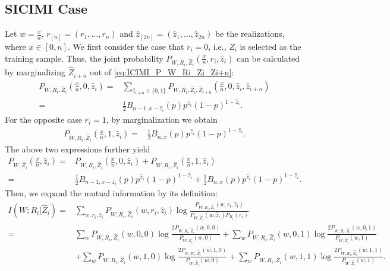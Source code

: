 \documentclass[onecolumn,romanappendices,10pt]{IEEEtran}
\begin{document}
	\subsection{SICIMI Case}  \label{subapp:cal_SICIMI}
	Let $w = \frac{x}{n}$, $r_{[n]} = (r_1, \ldots, r_n)$ and $\hat{z}_{[2n]} = (\hat{z}_1, \ldots, \hat{z}_{2n})$ be the realizations, where $x \in [0, n]$. We first consider the case that $r_i = 0$, i.e., $\hat{Z}_i$ is selected as the training sample. Thus, the joint probability $P_{W, R_i, \hat{Z}_{i}}(\frac{x}{n}, r_i, \hat{z}_{i})$ can be calculated by marginalizing $\hat{Z}_{i+n}$ out of \eqref{eq:ICIMI_P_W_Ri_Zi_Zi+n}:
	\begin{equation}
		\begin{aligned}
			P_{W, R_i, \hat{Z}_{i}}(\frac{x}{n}, 0, \hat{z}_{i}) =& \sum_{\hat{z}_{i+n} \in \{0,1\}} P_{W, R_i, \hat{Z}_{i}, \hat{Z}_{i+n}}(\frac{x}{n}, 0, \hat{z}_{i}, \hat{z}_{i+n}) \\
			=& \frac{1}{2} B_{n-1, x-\hat{z}_{i}}(p) p^{\hat{z}_{i}} (1-p)^{1-\hat{z}_{i}}.
		\end{aligned}\label{eq:P_W_R_Z_0}
	\end{equation}
	For the opposite case $r_i = 1$, by marginalization we obtain
	\begin{equation}
		\begin{aligned}
			P_{W, R_i, \hat{Z}_{i}}(\frac{x}{n}, 1, \hat{z}_{i}) =& \frac{1}{2} B_{n,x}(p) p^{\hat{z}_{i}} (1-p)^{1-\hat{z}_{i}}.
		\end{aligned}\label{eq:P_W_R_Z_1}
	\end{equation}
	The above two expressions further yield
	\begin{equation}
		\begin{aligned}
			P_{W, \hat{Z}_{i}}(\frac{x}{n}, \hat{z}_{i}) =& P_{W, R_i, \hat{Z}_{i}}(\frac{x}{n}, 0, \hat{z}_{i}) + P_{W, R_i, \hat{Z}_{i}}(\frac{x}{n}, 1, \hat{z}_{i}) \\ 
			=& \frac{1}{2} B_{n-1, x-\hat{z}_{i}}(p) p^{\hat{z}_{i}} (1-p)^{1-\hat{z}_{i}} + \frac{1}{2} B_{n,x}(p) p^{\hat{z}_{i}} (1-p)^{1-\hat{z}_{i}}.
		\end{aligned}\label{eq:P_W_Z}
	\end{equation}
	Then, we expand the mutual information by its definition:
	\begin{equation}
		\begin{aligned}
			I\left( W; R_i | \hat{Z}_{i} \right) =& \sum_{w, r_i, \hat{z}_{i}} P_{W, R_i, \hat{Z}_{i}}(w, r_i, \hat{z}_{i}) \log \frac{P_{W, R_i, \hat{Z}_{i}}(w, r_i, \hat{z}_{i})}{P_{W, \hat{Z}_{i}}(w, \hat{z}_{i}) P_{R_i}(r_i)} \\
			=& \sum_{w} P_{W, R_i, \hat{Z}_{i}}(w, 0, 0) \log \frac{2 P_{W, R_i, \hat{Z}_{i}}(w, 0, 0)}{P_{W, \hat{Z}_{i}}(w, 0)} + \sum_{w} P_{W, R_i, \hat{Z}_{i}}(w, 0, 1) \log \frac{2 P_{W, R_i, \hat{Z}_{i}}(w, 0, 1)}{P_{W, \hat{Z}_{i}}(w, 1)} \\
			& + \sum_{w} P_{W, R_i, \hat{Z}_{i}}(w, 1, 0) \log \frac{2 P_{W, R_i, \hat{Z}_{i}}(w, 1, 0)}{P_{W, \hat{Z}_{i}}(w, 0)} + \sum_{w} P_{W, R_i, \hat{Z}_{i}}(w, 1, 1) \log \frac{2 P_{W, R_i, \hat{Z}_{i}}(w, 1, 1)}{P_{W, \hat{Z}_{i}}(w, 1)}.
		\end{aligned}
	\end{equation}
\end{document}
